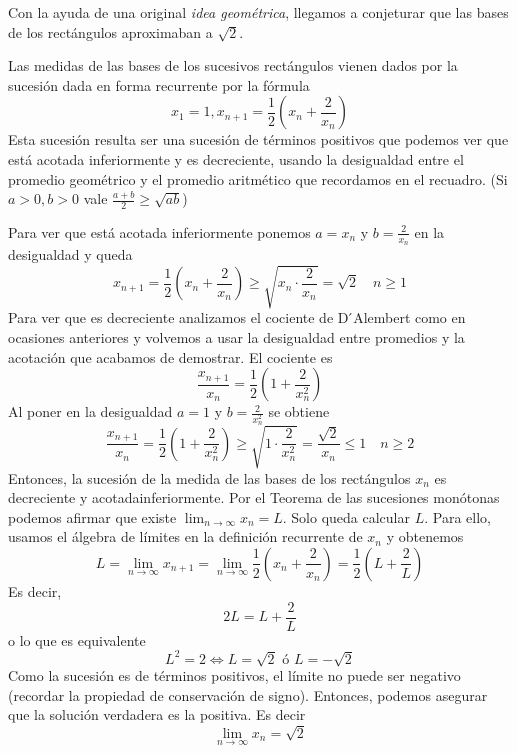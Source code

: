 \documentclass[../teoria.root.tex]{subfiles}
\begin{document}
Con la ayuda de una original \textit{idea geométrica}, llegamos a conjeturar que las bases de los rectángulos aproximaban a \(\sqrt{2}\).

Las medidas de las bases de los sucesivos rectángulos vienen dados por la sucesión dada en forma recurrente por la fórmula
\[x_1=1,x_{n+1}=\frac{1}{2}\left(x_n+\frac{2}{x_n}\right)\]
Esta sucesión resulta ser una sucesión de términos positivos que podemos ver que está acotada inferiormente y es decreciente, usando la desigualdad entre el promedio geométrico y el promedio aritmético que recordamos en el recuadro.
(Si \(a>0,b>0\) vale \(\frac{a+b}{2}\geq\sqrt{ab}\))

Para ver que está acotada inferiormente ponemos \(a=x_n\) y \(b=\frac{2}{x_n}\) en la desigualdad y queda
\[x_{n+1}=\frac{1}{2}\left(x_n+\frac{2}{x_n}\right)\geq\sqrt{x_n\cdot\frac{2}{x_n}}=\sqrt{2}\quad n\geq1\]
Para ver que es decreciente analizamos el cociente de D ́Alembert como en ocasiones anteriores y volvemos a usar la desigualdad entre promedios y la acotación que acabamos de demostrar.
El cociente es
\[\frac{x_{n+1}}{x_n}=\frac{1}{2}\left(1+\frac{2}{x^2_n}\right)\]
Al poner en la desigualdad \(a=1\) y \(b=\frac{2}{x^2_n}\) se obtiene
\[\frac{x_{n+1}}{x_n}=\frac{1}{2}\left(1+\frac{2}{x^2_n}\right)\geq\sqrt{1\cdot\frac{2}{x^2_n}}=\frac{\sqrt{2}}{x_n}\leq1\quad n\geq2\]
Entonces, la sucesión de la medida de las bases de los rectángulos \(x_n\) es decreciente y acotadainferiormente.
Por el Teorema de las sucesiones monótonas podemos afirmar que existe \(\lim_{n\to\infty}x_n=L\).
Solo queda calcular \(L\).
Para ello, usamos el álgebra de límites en la definición recurrente de \(x_n\) y obtenemos
\[L=\lim_{n\to\infty}x_{n+1}=\lim_{n\to\infty}\frac{1}{2}\left(x_n+\frac{2}{x_n}\right)=\frac{1}{2}\left(L+\frac{2}{L}\right)\]
Es decir,
\[2L=L+\frac{2}{L}\]
o lo que es equivalente
\[L^2=2\Longleftrightarrow L=\sqrt{2}\text{ ó }L=-\sqrt{2}\]
Como la sucesión es de términos positivos, el límite no puede ser negativo (recordar la propiedad de conservación de signo).
Entonces, podemos asegurar que la solución verdadera es la positiva.
Es decir
\[\lim_{n\to\infty}x_n=\sqrt{2}\]
\end{document}
